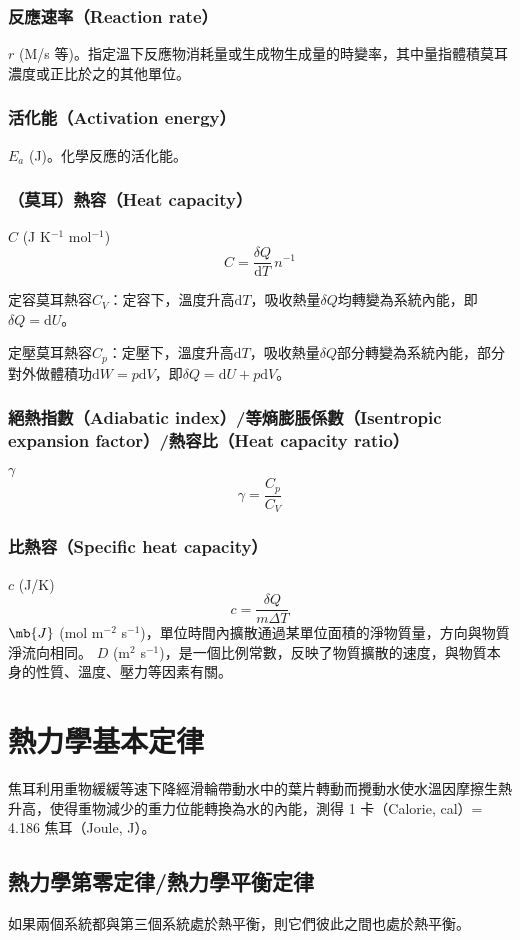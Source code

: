 \documentclass[a4paper,12pt]{report}
\begin{document}
\subsubsection{反應速率（Reaction rate）}
$r$ (M/s 等)。指定溫下反應物消耗量或生成物生成量的時變率，其中量指體積莫耳濃度或正比於之的其他單位。
\subsubsection{活化能（Activation energy）}
$E_a$ (J)。化學反應的活化能。
\subsubsection{（莫耳）熱容（Heat capacity）}
$C$ (J K$^{-1}$ mol$^{-1}$)
\[C = \frac{\delta Q}{\mathrm{d}T}\,n^{-1}\]
\bit
\item 定容莫耳熱容$C_V$：定容下，溫度升高$\mathrm{d}T$，吸收熱量$\delta Q$均轉變為系統內能，即$\delta Q = \mathrm{d}U$。
\item 定壓莫耳熱容$C_p$：定壓下，溫度升高$\mathrm{d}T$，吸收熱量$\delta Q$部分轉變為系統內能，部分對外做體積功$\mathrm{d}W = p\mathrm{d}V$，即$\delta Q = \mathrm{d}U + p\mathrm{d}V$。
\eit
\subsubsection{絕熱指數（Adiabatic index）/等熵膨脹係數（Isentropic expansion factor）/熱容比（Heat capacity ratio）}
$\gamma$
\[\gamma = \frac{C_p}{C_V}\]
\subsubsection{比熱容（Specific heat capacity）}
$c$ (J/K)
\[c=\frac{\delta Q}{m\Delta T}\]
$\mb{J}$ (mol m$^{-2}$ s$^{-1}$)，單位時間內擴散通過某單位面積的淨物質量，方向與物質淨流向相同。
$D$ (m$^2$ s$^{-1}$)，是一個比例常數，反映了物質擴散的速度，與物質本身的性質、溫度、壓力等因素有關。


\section{熱力學基本定律}
焦耳利用重物緩緩等速下降經滑輪帶動水中的葉片轉動而攪動水使水溫因摩擦生熱升高，使得重物減少的重力位能轉換為水的內能，測得 1 卡（Calorie, cal）= 4.186 焦耳（Joule, J）。
\subsection{熱力學第零定律/熱力學平衡定律}
如果兩個系統都與第三個系統處於熱平衡，則它們彼此之間也處於熱平衡。
\end{document}
